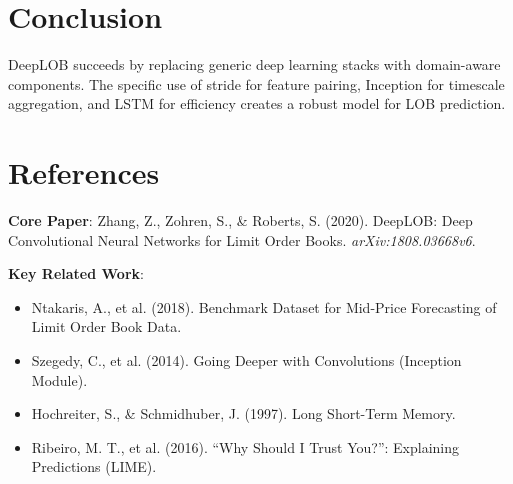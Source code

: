 \documentclass[10pt]{article}
\begin{document}
\section{Conclusion}
DeepLOB succeeds by replacing generic deep learning stacks with domain-aware components. 
The specific use of stride for feature pairing, Inception for timescale aggregation, and LSTM for efficiency creates a robust model for LOB prediction.

\section*{References}

\textbf{Core Paper}: Zhang, Z., Zohren, S., \& Roberts, S. (2020). DeepLOB: Deep Convolutional Neural Networks for Limit Order Books. \textit{arXiv:1808.03668v6}.

\textbf{Key Related Work}:
\begin{itemize}
    \item Ntakaris, A., et al. (2018). Benchmark Dataset for Mid-Price Forecasting of Limit Order Book Data.
    \item Szegedy, C., et al. (2014). Going Deeper with Convolutions (Inception Module).
    \item Hochreiter, S., \& Schmidhuber, J. (1997). Long Short-Term Memory.
    \item Ribeiro, M. T., et al. (2016). ``Why Should I Trust You?'': Explaining Predictions (LIME).
\end{itemize}
\end{document}

